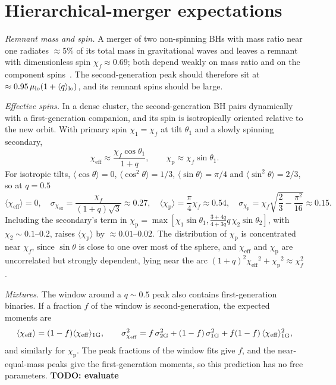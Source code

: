 \documentclass[%
 onecolumn,
 amsmath,amssymb,
 aps,
 prl,
 nofootinbib,nobibnotes,
]{revtex4-2}
\newcommand{\chieff}{\ensuremath{\chi_{\mathrm{eff}}}}
\newcommand{\chip}{\ensuremath{\chi_{\mathrm{p}}}}
\newcommand{\todo}[1]{{\color{Blue}\bf TODO: #1}}
\begin{document}
\section{Hierarchical-merger expectations}
\label{sm: hierarchical}

\textit{Remnant mass and spin.} A merger of two non-spinning \acp{BH} with mass ratio near one radiates $\approx 5\%$ of its total mass in gravitational waves and leaves a remnant with dimensionless spin $\chi_f \approx 0.69$; both depend weakly on mass ratio and on the component spins~\cite{Gerosa:2021mno}. The second-generation peak should therefore sit at $\approx 0.95\,\mu_{\rm lo}(1 + \langle q \rangle_{\rm lo})$, and its remnant spins should be large.

\textit{Effective spins.} In a dense cluster, the second-generation \ac{BH} pairs dynamically with a first-generation companion, and its spin is isotropically oriented relative to the new orbit. With primary spin $\chi_1 = \chi_f$ at tilt $\theta_1$ and a slowly spinning secondary,
\begin{equation}
    \chieff \approx \frac{\chi_f \cos\theta_1}{1 + q}, \qquad \chip \approx \chi_f \sin\theta_1.
\end{equation}
For isotropic tilts, $\langle\cos\theta\rangle = 0$, $\langle\cos^2\theta\rangle = 1/3$, $\langle\sin\theta\rangle = \pi/4$ and $\langle\sin^2\theta\rangle = 2/3$, so at $q = 0.5$
\begin{equation}
    \langle\chieff\rangle = 0, \quad \sigma_{\chieff} = \frac{\chi_f}{(1+q)\sqrt{3}} \approx 0.27, \quad \langle\chip\rangle = \frac{\pi}{4}\chi_f \approx 0.54, \quad \sigma_{\chip} = \chi_f\sqrt{\frac{2}{3} - \frac{\pi^2}{16}} \approx 0.15.
\end{equation}
Including the secondary's term in $\chip = \max[\chi_1\sin\theta_1, \frac{3 + 4q}{4 + 3q} q\, \chi_2\sin\theta_2]$, with $\chi_2 \sim 0.1$--$0.2$, raises $\langle\chip\rangle$ by $\approx 0.01$--$0.02$. The distribution of $\chip$ is concentrated near $\chi_f$, since $\sin\theta$ is close to one over most of the sphere, and $\chieff$ and $\chip$ are uncorrelated but strongly dependent, lying near the arc $(1+q)^2\chieff^2 + \chip^2 \approx \chi_f^2$.

\textit{Mixtures.} The window around a $q \sim 0.5$ peak also contains first-generation binaries. If a fraction $f$ of the window is second-generation, the expected moments are
\begin{equation}
    \langle\chieff\rangle = (1 - f)\langle\chieff\rangle_{\rm 1G}, \qquad \sigma^2_{\chieff} = f\,\sigma^2_{\rm 2G} + (1 - f)\,\sigma^2_{\rm 1G} + f(1 - f)\,\langle\chieff\rangle_{\rm 1G}^2,
\end{equation}
and similarly for $\chip$. The peak fractions of the window fits give $f$, and the near-equal-mass peaks give the first-generation moments, so this prediction has no free parameters. \todo{evaluate}
\end{document}
